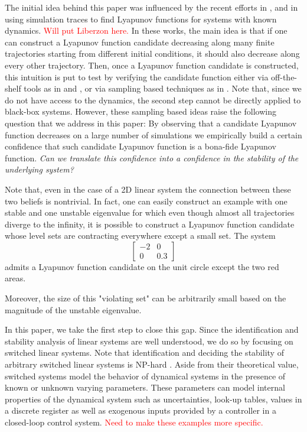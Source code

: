 The initial idea behind this paper was influenced by the recent efforts in \cite{topcu}, \cite{kapinski} and \cite{lazar} in using simulation traces to find Lyapunov functions for systems with known dynamics. \textcolor{red}{Will put Liberzon here.} In these works, the main idea is that if one can construct a Lyapunov function candidate decreasing along many finite trajectories starting from different initial conditions, it should also decrease along every other trajectory. Then, once a Lyapunov function candidate is constructed, this intuition is put to test by verifying the candidate function either via off-the-shelf tools as in \cite{topcu} and \cite{kapinski}, or via sampling based techniques as in \cite{lazar}. Note that, since we do not have access to the dynamics, the second step cannot be directly applied to black-box systems. However, these sampling based ideas raise the following question that we address in this paper: By observing that a candidate Lyapunov function decreases on a large number of simulations we empirically build a certain confidence that such candidate Lyapunov function is a bona-fide Lyapunov function. \emph{Can we translate this confidence into a confidence in the stability of the underlying system?} 

Note that, even in the case of a 2D linear system the connection between these two beliefs is nontrivial. In fact, one can easily construct an example with one stable and one unstable eigenvalue for which even though almost all trajectories diverge to the infinity, it is possible to construct a Lyapunov function candidate whose level sets are contracting everywhere except a small set. 
The system
\[
\begin{bmatrix}
-2 & 0\\
0 & 0.3
\end{bmatrix}
\]
admits a Lyapunov function candidate on the unit circle except the two red areas.
\begin{center}
\end{center}

Moreover, the size of this "violating set" can be arbitrarily small based on the magnitude of the unstable eigenvalue. 

In this paper, we take the first step to close this gap. Since the identification and stability analysis of linear systems are well understood, we do so by focusing on switched linear systems. Note that identification and deciding the stability of arbitrary switched linear systems is NP-hard \cite{jungersBook}. Aside from their theoretical value, switched systems model the behavior of dynamical systems in the presence of known or unknown varying parameters. These parameters can model internal properties of the dynamical system such as uncertainties, look-up tables, values in a discrete register as well as exogenous inputs provided by a controller in a closed-loop control system. \textcolor{red}{Need to make these examples more specific.}

